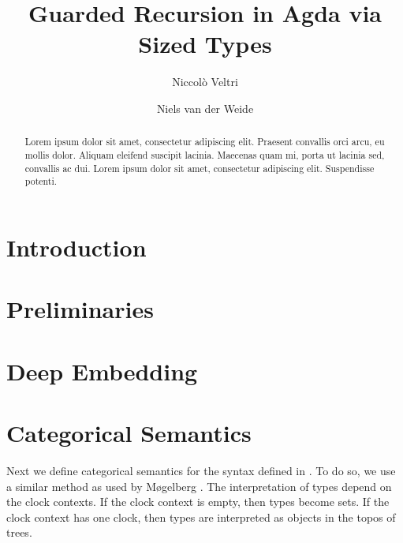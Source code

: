 \documentclass[a4paper,UKenglish,cleveref, autoref,numberwithinsect]{lipics-v2019}
\title{Guarded Recursion in Agda via Sized Types}
\author{Niccol\`o Veltri}{Department of Computer Science, IT
  University of Copenhagen, Denmark}{nive@itu.dk}{[orcid]}{[funding]}
\author{Niels van der Weide}{Institute for Computation and Information Sciences, Radboud University, The Netherlands}{nweide@cs.ru.nl}{https://orcid.org/0000-0003-1146-4161}{}
\begin{document}
\maketitle

\begin{abstract}
Lorem ipsum dolor sit amet, consectetur adipiscing elit. Praesent convallis orci arcu, eu mollis dolor. Aliquam eleifend suscipit lacinia. Maecenas quam mi, porta ut lacinia sed, convallis ac dui. Lorem ipsum dolor sit amet, consectetur adipiscing elit. Suspendisse potenti. 
 \end{abstract}

\section{Introduction}
\label{sec:intro}

\nocite{*}

\section{Preliminaries}
\label{sec:prelim}



\section{Deep Embedding}
\label{sec:syntax}



\section{Categorical Semantics}
Next we define categorical semantics for the syntax defined in .
To do so, we use a similar method as used by M{\o}gelberg \cite{Mogelberg14}.
The interpretation of types depend on the clock contexts.
If the clock context is empty, then types become sets.
If the clock context has one clock, then types are interpreted as objects in the topos of trees.
\end{document}
